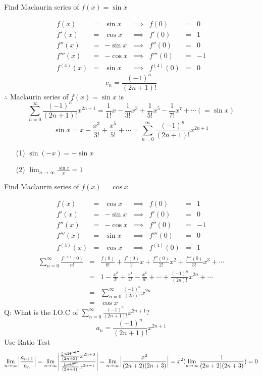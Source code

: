 \begin{eg}
Find Maclaurin series of \(f(x) = \sin x\)

\soln
\[\begin{array}{rcrcrcr}
f(x) & = & \sin x & \implies & f(0) & = & 0\\
f'(x) & = & \cos x & \implies & f'(0) & = & 1\\
f''(x) & = & -\sin x & \implies & f''(0) & = & 0\\
f'''(x) & = & -\cos x & \implies & f'''(0) & = & -1\\
f^{(4)}(x) & = & \sin x & \implies & f^{(4)}(0) & = & 0
\end{array}\]
\[\displaystyle c_n = \frac{(-1)^n}{(2n + 1)!}\]
\(\therefore\) Maclaurin series of \(f(x) = \sin x\) is 
\[\displaystyle \sum^{\infty}_{n = 0} \frac{(-1)^n}{(2n + 1)!}x^{2n + 1} = \frac{1}{1!} x - \frac{1}{3!} x^3 + \frac{1}{5!} x^5 - \frac{1}{7!} x^7 + \cdots (= \sin x)\]
\[\displaystyle \sin x = x - \frac{x^3}{3!} + \frac{x^5}{5!} + \cdots = \sum^{\infty}_{n = 0} \frac{(-1)^n}{(2n + 1)!} x^{2n + 1}\]
\begin{itemize}
\item[(1)] \(\sin (-x) = - \sin x\)
\item[(2)] \(\displaystyle \lim_{n \to \infty} \frac{\sin x}{x} = 1\)
\end{itemize}
\end{eg}
\begin{eg}
Find Maclaurin series of \(f(x) = \cos x\)

\soln
\[\begin{array}{rcrcrcr}
f(x) & = & \cos x & \implies & f(0) & = & 1\\
f'(x) & = & -\sin x & \implies & f'(0) & = & 0\\
f''(x) & = & -\cos x & \implies & f''(0) & = & -1\\
f'''(x) & = & \sin x & \implies & f'''(0) & = & 0\\
f^{(4)}(x) & = & \cos x & \implies & f^{(4)}(0) & = & 1
\end{array}\]
\[\begin{array}{rcl}
\displaystyle \sum^{\infty}_{n = 0} \frac{f^{(n)}(0)}{n!} & = & \displaystyle \frac{f(0)}{0!} + \frac{f'(0)}{1!}x + \frac{f''(0)}{2!}x^2 + \frac{f'''(0)}{3!}x^3 + \cdots\\
& = & \displaystyle 1 - \frac{x^2}{2!} + \frac{x^4}{4!} - \frac{x^6}{6!} + \cdots + \frac{(-1)^n}{(2n)!} x^{2n} + \cdots\\
& = & \displaystyle \sum^{\infty}_{n = 0} \frac{(-1)^n}{(2n)!} x^{2n}\\
& = & \cos x
\end{array}\]
Q: What is the I.O.C of \(\displaystyle \sum^{\infty}_{n = 0} \frac{(-1)^n}{(2n + 1)!} x^{2n + 1}\)?
\[\displaystyle a_n = \frac{(-1)^n}{(2n + 1)!} x^{2n + 1}\]
Use Ratio Test
\[\displaystyle \lim_{n \to \infty} \Big| \frac{a_{n + 1}}{a_n} \Big| = \lim_{n \to \infty} \Bigg| \frac{\frac{\cancel{(-1)^{n + 1}}}{(2n + 3)!}x^{2n + 3}}{\frac{\cancel{(-1)^n}}{(2n + 1)!}x^{2n + 1}}\Bigg| = \lim_{n \to \infty} \Big| \frac{x^2}{(2n + 2)(2n + 3)} \Big| = x^2 (\lim_{n \to \infty} \frac{1}{(2n + 2)(2n + 3)}) = 0\]
\end{eg}
